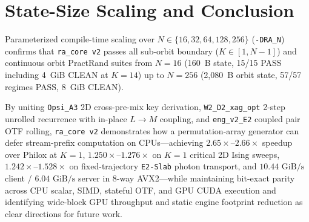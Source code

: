 \documentclass[conference]{IEEEtran}
\begin{document}
\section{State-Size Scaling and Conclusion}\label{sec:conclusion}

Parameterized compile-time scaling over $N \in \{16, 32, 64, 128, 256\}$ (\texttt{-DRA\_N}) confirms that \texttt{ra\_core v2} passes all sub-orbit boundary ($K \in [1, N-1]$) and continuous orbit PractRand suites from $N=16$ (160~B state, 15/15 PASS including 4~GiB CLEAN at $K=14$) up to $N=256$ (2,080~B orbit state, 57/57 regimes PASS, 8~GiB CLEAN).

By uniting \texttt{Opsi\_A3} 2D cross-pre-mix key derivation, \texttt{W2\_D2\_xag\_opt} 2-step unrolled recurrence with in-place $L \to M$ coupling, and \texttt{eng\_v2\_E2} coupled pair OTF rolling, \texttt{ra\_core v2} demonstrates how a permutation-array generator can defer stream-prefix computation on CPUs---achieving $2.65\times$--$2.66\times$ speedup over Philox at $K=1$, $1.250\times$--$1.276\times$ on $K=1$ critical 2D Ising sweeps, $1.242\times$--$1.528\times$ on fixed-trajectory \texttt{E2-Slab} photon transport, and $10.44\text{ GiB/s}$ client / $6.04\text{ GiB/s}$ server in 8-way AVX2---while maintaining bit-exact parity across CPU scalar, SIMD, stateful OTF, and GPU CUDA execution and identifying wide-block GPU throughput and static engine footprint reduction as clear directions for future work.



\end{document}
